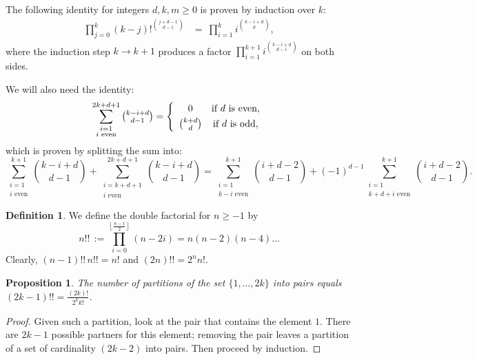 \documentclass{amsart}
\newcommand{\coloneqq}{:=}
\theoremstyle{plain}
\newtheorem{proposition}[theorem]{Proposition}
\theoremstyle{definition}
\newtheorem{definition}[theorem]{Definition}
\theoremstyle{remark}
\begin{document}
The following identity for integers $d,k,m\geq 0$ is proven by induction over $k$:
\begin{align} \label{facprod1}
\prod_{j=0}^k (k-j)!^{\binom{j+d-1}{d-1}} &= \ \prod_{i=1}^k i^{\binom{k-i+d}{d}},
\end{align}
where the induction step $k\rightarrow k+1$ produces a factor $\prod\limits_{i=1}^{k+1} i^{\binom{k-i+d}{d-1} }$ on both sides.

We will also need the identity:
\begin{equation} \label{evensum}
\sum_{\substack{i=1\\i\text{ even}}}^{2k+d+1}\textstyle \binom{k-i+d}{d-1} = \left\{ 
 \begin{array}{*2{c}p{5cm}}0 &\text{if }d\text{ is even}, \vspace{1mm}\\
 \binom{k+d}{d} &\text{if }d\text{ is odd},
\end{array}\right.
\end{equation}
which is proven by splitting the sum into:
$$
\sum_{\substack{i=1\\i\text{ even}}}^{k+1} \textstyle\binom{k-i+d}{d-1} + \displaystyle\sum_{\substack{i=k+d+1\\i\text{ even}}}^{2k+d+1}\textstyle \binom{k-i+d}{d-1}
= \displaystyle\sum_{\substack{i=1\\k-i\text{ even}}}^{k+1}\!\! \textstyle\binom{i+d-2}{d-1} +(-1)^{d-1} \!\!\!\!
 \displaystyle\sum_{\substack{i=1\\k+d+i\text{ even}}}^{k+1} \!\!\!\! \textstyle\binom{i+d-2}{d-1} .
$$

\begin{definition}\label{doublefactorial}
We define the double factorial for $ n\geq -1$ by 
$$n!! \,\coloneqq \prod_{i=0}^{\left\lfloor\!\frac{n-1}{2}\!\right\rfloor }(n-2i)=n(n-2)(n-4)\ldots $$
Clearly, $(n-1)!!\,n!! = n!$ and $(2n)!! = 2^n n!$.
\end{definition}
\begin{proposition} \label{partitioncount}
The number of partitions of the set $\{1,\ldots,2k\}$ into pairs equals $(2k-1)!! = \frac{(2k)!}{2^kk!}$.
\end{proposition}
\begin{proof}
Given such a partition, look at the pair that contains the element $1$. There are $2k-1$ possible partners for this element; removing the pair leaves a partition of a set of cardinality $(2k-2)$ into pairs. Then proceed by induction.
\end{proof}
\end{document}
